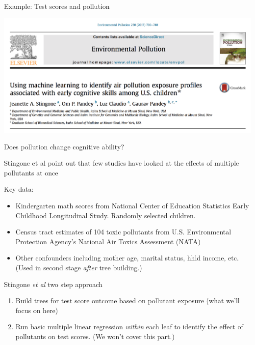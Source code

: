 \documentclass[mathserif, aspectratio=169]{beamer}
\begin{document}
\begin{frame}{Example: Test scores and pollution}

\includegraphics[width=\textwidth]{stingone_etal}
\end{frame}

\begin{frame}{Does pollution change cognitive ability?}

Stingone et al point out that few studies have looked at the effects of multiple pollutants at once

Key data:
\begin{itemize}
\item Kindergarten math scores from National Center of Education Statistics Early Childhood Longitudinal Study.  Randomly selected children.
\item Census tract estimates of 104 toxic pollutants from U.S. Environmental Protection Agency's National Air Toxics Assessment (NATA)
\item Other confounders including mother age, marital status, hhld income, etc.  (Used in second stage \textit{after} tree building.)
\end{itemize}

\end{frame}

\begin{frame}{Stingone \textit{et al} two step approach}

\begin{enumerate}
\item Build trees for test score outcome based on pollutant exposure (what we'll focus on here)
\item Run basic multiple linear regression \textit{within} each leaf to identify the effect of pollutants on test scores.  (We won't cover this part.)
\end{enumerate}
\end{frame}
\end{document}
